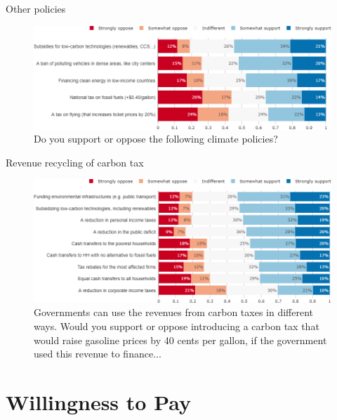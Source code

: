 \documentclass[aspectratio=169,9pt,dvipsnames]{beamer}
\begin{document}
\begin{frame}{Other policies}%
\begin{figure}[h!]
\centering
\caption{Do you support or oppose the following climate policies?}
\vspace{2mm}
\includegraphics[width=\textwidth]{../figures/US/policy_US.png}
\end{figure}
\end{frame}

\begin{frame}{Revenue recycling of carbon tax}%
\begin{figure}[h!]
\centering
\caption{Governments can use the revenues from carbon taxes in different ways. Would you support or oppose introducing a carbon tax that would raise gasoline prices by 40 cents per gallon, if the government used this revenue to finance...}
\vspace{2mm}
\includegraphics[width=\textwidth]{../figures/US/tax_US.png}
\end{figure}
\end{frame}

\section{Willingness to Pay}
\end{document}
